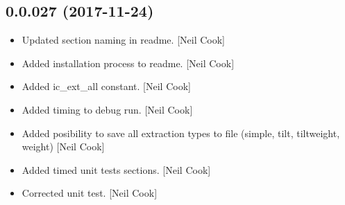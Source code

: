\documentclass[a4paper,10pt,english]{report}
\begin{document}
\subsection{0.0.027 (2017-11-24)}
\label{\detokenize{misc/changelog:id523}}\begin{itemize}
\item {} 
Updated section naming in readme. {[}Neil Cook{]}

\item {} 
Added installation process to readme. {[}Neil Cook{]}

\item {} 
Added ic\_ext\_all constant. {[}Neil Cook{]}

\item {} 
Added timing to debug run. {[}Neil Cook{]}

\item {} 
Added posibility to save all extraction types to file (simple, tilt,
tiltweight, weight) {[}Neil Cook{]}

\item {} 
Added timed unit tests sections. {[}Neil Cook{]}

\item {} 
Corrected unit test. {[}Neil Cook{]}

\end{itemize}
\end{document}

